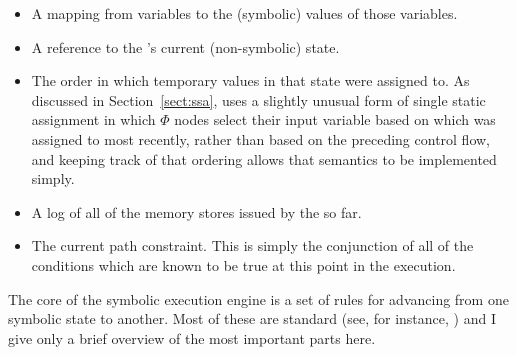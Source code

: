 \begin{itemize}
\item
  A mapping from {\StateMachine} variables to the (symbolic) values of
  those variables.
\item
  A reference to the {\StateMachine}'s current (non-symbolic) state.
\item
  The order in which temporary values in that state were assigned to.
  As discussed in Section~\ref{sect:ssa}, {\technique} uses a slightly
  unusual form of single static assignment in which $\Phi$ nodes
  select their input variable based on which was assigned to most
  recently, rather than based on the preceding control flow, and
  keeping track of that ordering allows that semantics to be
  implemented simply.
\item
  A log of all of the memory stores issued by the {\StateMachine} so
  far.
\item
  The current path constraint.  This is simply the conjunction of
  all of the conditions which are known to be true at this point in
  the execution.
\end{itemize}

The core of the symbolic execution engine is a set of rules for
advancing from one symbolic state to another.  Most of these are
standard (see, for instance, ) and I give only a brief overview of the most important
parts here.

